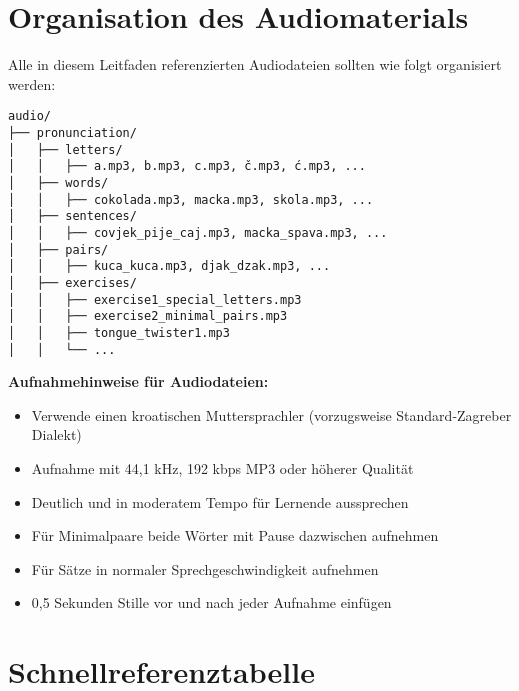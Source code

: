 \section{Organisation des Audiomaterials}

Alle in diesem Leitfaden referenzierten Audiodateien sollten wie folgt organisiert werden:

\begin{verbatim}
audio/
├── pronunciation/
│   ├── letters/
│   │   ├── a.mp3, b.mp3, c.mp3, č.mp3, ć.mp3, ...
│   ├── words/
│   │   ├── cokolada.mp3, macka.mp3, skola.mp3, ...
│   ├── sentences/
│   │   ├── covjek_pije_caj.mp3, macka_spava.mp3, ...
│   ├── pairs/
│   │   ├── kuca_kuca.mp3, djak_dzak.mp3, ...
│   ├── exercises/
│   │   ├── exercise1_special_letters.mp3
│   │   ├── exercise2_minimal_pairs.mp3
│   │   ├── tongue_twister1.mp3
│   │   └── ...
\end{verbatim}

\textbf{Aufnahmehinweise für Audiodateien:}
\begin{itemize}
    \item Verwende einen kroatischen Muttersprachler (vorzugsweise Standard-Zagreber Dialekt)
    \item Aufnahme mit 44,1 kHz, 192 kbps MP3 oder höherer Qualität
    \item Deutlich und in moderatem Tempo für Lernende aussprechen
    \item Für Minimalpaare beide Wörter mit Pause dazwischen aufnehmen
    \item Für Sätze in normaler Sprechgeschwindigkeit aufnehmen
    \item 0,5 Sekunden Stille vor und nach jeder Aufnahme einfügen
\end{itemize}

\section{Schnellreferenztabelle}

